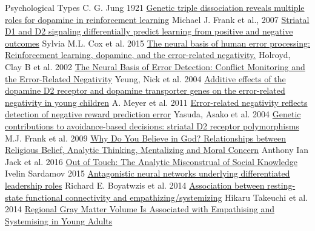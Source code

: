 \documentclass[11pt,a4paper]{article}
\begin{document}
\begin{thebibliography}{9}

  Psychological Types
  C. G. Jung 1921
  \href{http://www.pnas.org/content/104/41/16311.full}{Genetic triple dissociation reveals multiple roles for dopamine in reinforcement learning}
  Michael J. Frank et al., 2007
  \href{http://www.sciencedirect.com/science/article/pii/S1053811914010763}{Striatal D1 and D2 signaling differentially predict learning from positive and negative outcomes}
  Sylvia M.L. Cox et al. 2015
  \href{http://psycnet.apa.org/psycinfo/2002-18225-003}{The neural basis of human error processing: Reinforcement learning, dopamine, and the error-related negativity.}
  Holroyd, Clay B et al. 2002
  \href{http://psycnet.apa.org/journals/rev/111/4/931/}{The Neural Basis of Error Detection: Conflict Monitoring and the Error-Related Negativity}
  Yeung, Nick et al. 2004
  \href{(http://onlinelibrary.wiley.com/doi/10.1111/j.1601-183X.2012.00812.x/full}{Additive effects of the dopamine D2 receptor and dopamine transporter genes on the error-related negativity in young children}
  A. Meyer et al. 2011
  \href{http://journals.lww.com/neuroreport/Abstract/2004/11150/Error_related_negativity_reflects_detection_of.27.aspx}{Error-related negativity reflects detection of negative reward prediction error}
  Yasuda, Asako et al. 2004
  \href{http://www.sciencedirect.com/science/article/pii/S0306452209006551}{Genetic contributions to avoidance-based decisions: striatal D2 receptor polymorphisms}
  M.J. Frank et al. 2009
  \href{http://journals.plos.org/plosone/article?id=10.1371/journal.pone.0149989}{Why Do You Believe in God? Relationships between Religious Belief, Analytic Thinking, Mentalizing and Moral Concern}
  Anthony Ian Jack et al. 2016
  \href{http://www.tandfonline.com/doi/abs/10.1080/08913811.2015.975915}{Out of Touch: The Analytic Misconstrual of Social Knowledge}
  Ivelin Sardamov 2015
  \href{http://journal.frontiersin.org/Journal/10.3389/fnhum.2014.00114/full}{Antagonistic neural networks underlying differentiated leadership roles}
  Richard E. Boyatwzis et al. 2014
  \href{http://www.sciencedirect.com/science/article/pii/S1053811914003966}{Association between resting-state functional connectivity and empathizing/systemizing}
  Hikaru Takeuchi et al. 2014
  \href{http://journals.plos.org/plosone/article?id=10.1371/journal.pone.0084782}{Regional Gray Matter Volume Is Associated with Empathising and Systemising in Young Adults}

\end{thebibliography}
\end{document}
